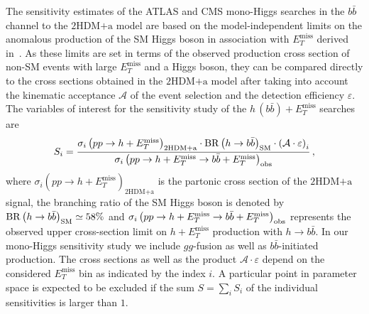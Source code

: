 \documentclass[a4paper, 11pt,notoc]{article}
\newcommand{\MET}{\ensuremath{E_T^\mathrm{miss}}\xspace}
\newcommand{\met}{\MET}
\newcommand{\hdma}{\ensuremath{\textrm{2HDM+a}}\xspace}
\begin{document}
The sensitivity estimates of the ATLAS and CMS mono-Higgs searches in the $b \bar b$ channel to the \hdma model are based on the model-independent limits on the anomalous production of the SM Higgs boson in association with \met derived in~\cite{Aaboud:2017yqz}.  As these limits are set in terms of the observed production cross section of non-SM events with large $\MET$ and a Higgs boson, they can be compared directly to the cross sections obtained in the \hdma model after taking into account the kinematic acceptance $\mathcal{A}$ of the event selection and the detection efficiency $\varepsilon$. The variables of interest for the sensitivity study of the $h \, (b \bar b) + \MET$ searches are
\begin{equation}
\label{eq:monoHbb_sensi}
S_i = \frac{\sigma_{i} \left ( p p \to h + \MET \right)_{\hdma} \cdot {\rm BR} \left (h \to b \bar b \right )_{\rm SM} \cdot \left ( \mathcal{A} \cdot \varepsilon \right)_i}
{\sigma_{i} \left ( p p \to h + \MET \to b \bar b + \MET \right)_{\rm obs}}\,,
\end{equation}
where $\sigma_{i} \left ( p p \to h + \MET \right)_{\hdma}$ is the partonic cross section of the \hdma signal,  the branching ratio of the SM Higgs boson is denoted by ${\rm BR} \left (h \to b \bar b \right )_{\rm SM} \simeq 58\%$  and $\sigma_{i} \left ( p p \to h + \MET \to b \bar b + \MET \right)_{\rm obs}$ represents the  observed upper cross-section limit on $h + \MET$ production with $h \to b \bar b$. In our mono-Higgs sensitivity study we include $gg$-fusion as well as $b \bar b$-initiated production.  The cross sections as well as the product $ \mathcal{A} \cdot \varepsilon$ depend on the considered $\MET$ bin as indicated by the index $i$.   A particular point in parameter space is expected to be excluded if the sum $S = \sum_i S_i$ of the individual sensitivities is larger than $1$.
\end{document}
